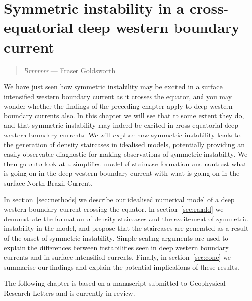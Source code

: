 \chapter{Symmetric instability in a cross-equatorial deep western boundary current}
\begin{quote}
    \textit{Brrrrrrr} --- Fraser Goldsworth
\end{quote}

We have just seen how symmetric instability may be excited in a surface intensified western boundary current as it crosses the equator, and you may wonder whether the findings of the preceding chapter apply to deep western boundary currents also. In this chapter we will see that to some extent they do, and that symmetric instability may indeed be excited in cross-equatorial deep western boundary currents. We will explore how symmetric instability leads to the generation of density staircases in idealised models, potentially providing an easily observable diagnostic for making observations of symmetric instability. We then go onto look at a simplified model of staircase formation and contrast what is going on in the deep western boundary current with what is going on in the surface North Brazil Current.

In section~\ref{sec:methods} we describe our idealised numerical model of a deep western boundary current crossing the equator. In section~\ref{sec:randd} we demonstrate the formation of density staircases and the excitement of symmetric instability in the model, and propose that the staircases are generated as a result of the onset of symmetric instability. Simple scaling arguments are used to explain the differences between instabilities seen in deep western boundary currents and in surface intensified currents. Finally, in section~\ref{sec:conc} we summarise our findings and explain the potential implications of these results.

The following chapter is based on a manuscript submitted to Geophysical Research Letters and is currently in review.

